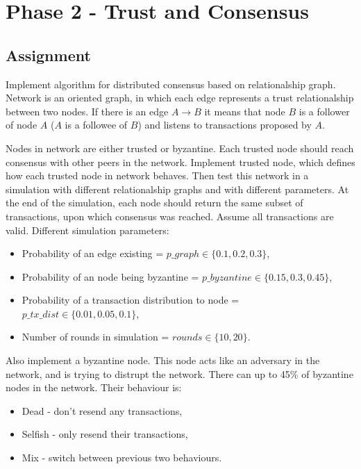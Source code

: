 \section{Phase 2 - Trust and Consensus}

\subsection{Assignment}

Implement algorithm for distributed consensus based on relationalship graph.
Network is an oriented graph, in which each edge represents a trust relationalship
between two nodes. If there is an edge $A \rightarrow B$ it means that node $B$
is a follower of node $A$ ($A$ is a followee of $B$) and listens to transactions
proposed by $A$.

Nodes in network are either trusted or byzantine. Each trusted node should
reach consensus with other peers in the network. Implement trusted node,
which defines how each trusted node in network behaves. Then test this network
in a simulation with different relationalship graphs and with different parameters.
At the end of the simulation, each node should return the same subset of transactions,
upon which consensus was reached. Assume all transactions are valid. Different
simulation parameters:

\begin{itemize}
    \item Probability of an edge existing = $p\_graph \in \{0.1, 0.2, 0.3\}$,
    \item Probability of an node being byzantine = $p\_byzantine \in \{0.15, 0.3, 0.45\}$,
    \item Probability of a transaction distribution to node = $p\_tx\_dist \in \{0.01, 0.05, 0.1\}$,
    \item Number of rounds in simulation = $rounds \in \{10, 20\}$.
\end{itemize}

Also implement a byzantine node. This node acts like an adversary in the network,
and is trying to distrupt the network. There can up to 45\% of byzantine nodes
in the network. Their behaviour is:

\begin{itemize}
    \item Dead - don't resend any transactions,
    \item Selfish - only resend their transactions,
    \item Mix - switch between previous two behaviours.
\end{itemize}


